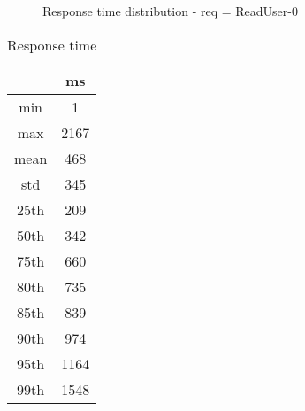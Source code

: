 \begin{minipage}{0.75\linewidth}
\begin{figure}[h]
\begin{adjustbox}{max width=1.0\linewidth, keepaspectratio}
  \end{adjustbox}
  \caption{Response time distribution - req = ReadUser-0}
\end{figure}
\end{minipage}\hfill\begin{minipage}{0.18\linewidth}
\begin{table}[h]
\begin{tabular}{|cc|}
\hline
\textbf{} & \textbf{ms}\\ \hline
 \Xhline{0.005\arrayrulewidth}
min & 1\\
 \Xhline{0.005\arrayrulewidth}
max & 2167\\
 \Xhline{0.005\arrayrulewidth}
mean & 468\\
 \Xhline{0.005\arrayrulewidth}
std & 345\\
\hline
\hline
 \Xhline{0.005\arrayrulewidth}
25th & 209\\
 \Xhline{0.005\arrayrulewidth}
50th & 342\\
 \Xhline{0.005\arrayrulewidth}
75th & 660\\
 \Xhline{0.005\arrayrulewidth}
80th & 735\\
 \Xhline{0.005\arrayrulewidth}
85th & 839\\
 \Xhline{0.005\arrayrulewidth}
90th & 974\\
 \Xhline{0.005\arrayrulewidth}
95th & 1164\\
 \Xhline{0.005\arrayrulewidth}
99th & 1548\\
\hline
\end{tabular}
\caption{Response time}
\end{table}
\end{minipage}\hfill